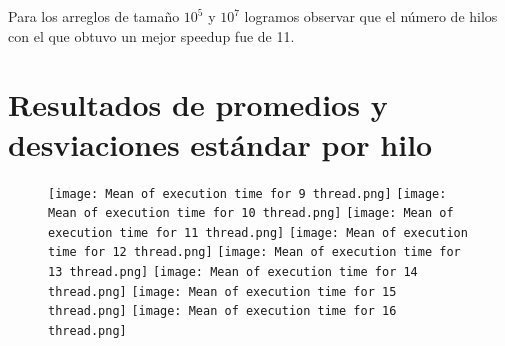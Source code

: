 \documentclass[a4paper,12pt]{article}
\begin{document}
    Para los arreglos de tamaño $10^5$ y $10^7$ logramos observar que el número de hilos con el que obtuvo un mejor speedup fue de 11.
  
     
    \section{Resultados de promedios y desviaciones estándar por hilo}
    
    \begin{figure}[H]
    \centering
        \texttt{[image: Mean of execution time for 9 thread.png]}
        \texttt{[image: Mean of execution time for 10 thread.png]}
        \texttt{[image: Mean of      execution time for 11         thread.png]}
        \texttt{[image: Mean of execution time for 12 thread.png]}
        \texttt{[image: Mean of      execution time for 13         thread.png]}
        \texttt{[image: Mean of execution time for 14 thread.png]}
        \texttt{[image: Mean of      execution time for 15         thread.png]}
        \texttt{[image: Mean of execution time for 16 thread.png]}
    \end{figure}
\end{document}
